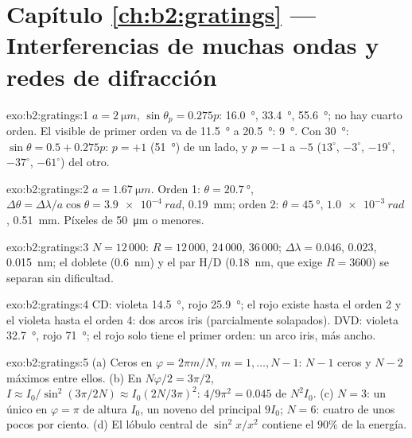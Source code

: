 \section*{Capítulo \ref{ch:b2:gratings} --- Interferencias de muchas ondas y redes de difracción}

\begin{solution}{exo:b2:gratings:1}
$a = \qty{2}{\micro m}$, $\sin\theta_p = 0.275p$: \qty{16.0}{\degree}, \qty{33.4}{\degree}, \qty{55.6}{\degree};
no hay cuarto orden. El visible de primer orden va de \qty{11.5}{\degree} a \qty{20.5}{\degree}:
\qty{9}{\degree}. Con \qty{30}{\degree}: $\sin\theta = 0.5 + 0.275p$: $p = +1$ (\qty{51}{\degree}) de un
lado, y $p = -1$ a $-5$ ($13^\circ$, $-3^\circ$, $-19^\circ$, $-37^\circ$, $-61^\circ$) del
otro.
\end{solution}

\begin{solution}{exo:b2:gratings:2}
$a = \qty{1.67}{\micro m}$. Orden 1: $\theta = \qty{20.7}{\degree}$, $\Delta\theta = \Delta\lambda/a\cos\theta =
\qty{3.9e-4}{rad}$, \qty{0.19}{mm}; orden 2: $\theta = \qty{45}{\degree}$, $\qty{1.0e-3}{rad}$,
\qty{0.51}{mm}. Píxeles de \qty{50}{\micro m} o menores.
\end{solution}

\begin{solution}{exo:b2:gratings:3}
$N = 12\,000$: $R = 12\,000$, $24\,000$, $36\,000$; $\Delta\lambda = 0.046$, $0.023$, \qty{0.015}{nm};
el doblete (\qty{0.6}{nm}) y el par H/D (\qty{0.18}{nm}, que exige $R = 3600$)
se separan sin dificultad.
\end{solution}

\begin{solution}{exo:b2:gratings:4}
CD: violeta \qty{14.5}{\degree}, rojo \qty{25.9}{\degree}; el rojo existe hasta el orden 2 y el violeta hasta el
orden 4: dos arcos iris (parcialmente solapados). DVD: violeta \qty{32.7}{\degree}, rojo
\qty{71}{\degree}; el rojo solo tiene el primer orden: un arco iris, más ancho.
\end{solution}

\begin{solution}{exo:b2:gratings:5}
(a) Ceros en $\varphi = 2\pi m/N$, $m = 1, \dots, N - 1$: $N - 1$ ceros y $N - 2$ máximos
entre ellos. (b) En $N\varphi/2 = 3\pi/2$, $I \approx I_0/\sin^2(3\pi/2N) \approx I_0(2N/3\pi)^2$:
$4/9\pi^2 = 0.045$ de $N^2I_0$. (c) $N = 3$: un único  en
$\varphi = \pi$ de altura $I_0$, un noveno del principal $9I_0$; $N = 6$: cuatro
 de unos pocos por ciento. (d) El lóbulo central de $\sin^2x/x^2$
contiene el $90\%$ de la energía.
\end{solution}

